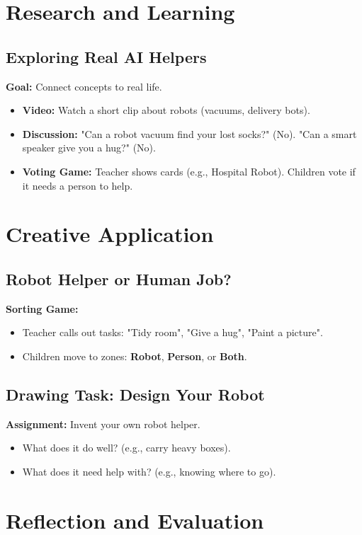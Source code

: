 \documentclass[11pt, a4paper]{article}
\begin{document}
\section{Research and Learning}
\subsection{Exploring Real AI Helpers}
\textbf{Goal:} Connect concepts to real life.
\begin{itemize}
    \item \textbf{Video:} Watch a short clip about robots (vacuums, delivery bots).
    \item \textbf{Discussion:} "Can a robot vacuum find your lost socks?" (No). "Can a smart speaker give you a hug?" (No).
    \item \textbf{Voting Game:} Teacher shows cards (e.g., Hospital Robot). Children vote if it needs a person to help.
\end{itemize}

\section{Creative Application}
\subsection{Robot Helper or Human Job?}
\textbf{Sorting Game:}
\begin{itemize}
    \item Teacher calls out tasks: "Tidy room", "Give a hug", "Paint a picture".
    \item Children move to zones: \textbf{Robot}, \textbf{Person}, or \textbf{Both}.
\end{itemize}

\subsection{Drawing Task: Design Your Robot}
\textbf{Assignment:} Invent your own robot helper.
\begin{itemize}
    \item What does it do well? (e.g., carry heavy boxes).
    \item What does it need help with? (e.g., knowing where to go).
\end{itemize}

\section{Reflection and Evaluation}
\end{document}
